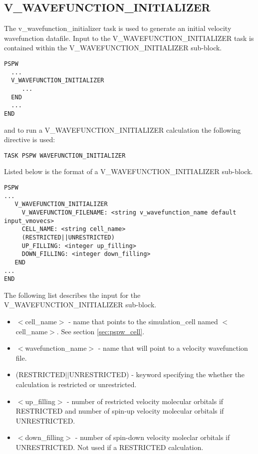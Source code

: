 \subsection{V\_WAVEFUNCTION\_INITIALIZER}
The v\_wavefunction\_initializer task is used to generate an initial velocity 
wavefunction datafile.
Input to the V\_WAVEFUNCTION\_INITIALIZER task is contained
within the V\_WAVEFUNCTION\_INITIALIZER sub-block.
\begin{verbatim}
PSPW
  ...
  V_WAVEFUNCTION_INITIALIZER
     ...
  END
  ...
END
\end{verbatim}
and to run a V\_WAVEFUNCTION\_INITIALIZER calculation the following directive 
is used:
\begin{verbatim}
TASK PSPW WAVEFUNCTION_INITIALIZER
\end{verbatim}
Listed below is the format of a V\_WAVEFUNCTION\_INITIALIZER sub-block.
\begin{verbatim}
PSPW
... 
   V_WAVEFUNCTION_INITIALIZER
     V_WAVEFUNCTION_FILENAME: <string v_wavefunction_name default input_vmovecs>
     CELL_NAME: <string cell_name>
     (RESTRICTED||UNRESTRICTED)
     UP_FILLING: <integer up_filling>
     DOWN_FILLING: <integer down_filling>
   END
...
END
\end{verbatim}
The following list describes the input for the V\_WAVEFUNCTION\_INITIALIZER
sub-block.
\begin{itemize}
	\item $<$cell\_name$>$ - name that points 
		to the simulation\_cell named $<$cell\_name$>$.  See section \ref{sec:pspw_cell}.
	\item $<$wavefunction\_name$>$ - name that will point
              to a velocity wavefunction file.
	\item (RESTRICTED$||$UNRESTRICTED) - keyword specifying the whether
              the calculation is restricted or unrestricted.
	\item $<$up\_filling$>$ - number of restricted velocity molecular 
	      orbitals if RESTRICTED and number of spin-up velocity molecular 
              orbitals if UNRESTRICTED.
        \item $<$down\_filling$>$ - number of spin-down velocity moleclar 
              orbitals if UNRESTRICTED.  Not used if a RESTRICTED calculation.
\end{itemize}



